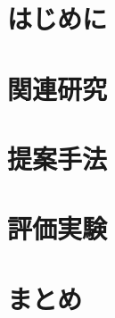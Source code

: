 \documentclass[twocolumn]{jsarticle}
\begin{document}
\maketitle
\thispagestyle{customPageStyle}
    
\section{はじめに}


\section{関連研究}


\section{提案手法}


\section{評価実験}


\section{まとめ}




\end{document}
